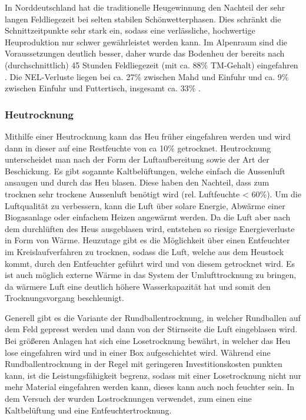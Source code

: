 In Norddeutschland hat die traditionelle Heugewinnung den Nachteil der sehr langen Feldliegezeit bei selten stabilen Schönwetterphasen.
Dies schränkt die Schnittzeitpunkte sehr stark ein, sodass eine verlässliche, hochwertige Heuproduktion nur schwer gewährleistet werden kann.
Im Alpenraum sind die Voraussetzungen deutlich besser, daher wurde das Bodenheu der \HBLFA bereits nach (durchschnittlich) 45 Stunden Feldliegezeit (mit ca. 88\% \ac{TM}-Gehalt) eingefahren \parencite[63]{gruber2015einfluss}.
Die \ac{NEL}-Verluste liegen bei ca. 27\% zwischen Mahd und Einfuhr und ca. 9\% zwischen Einfuhr und Futtertisch, insgesamt ca. 33\% \parencite[30]{fritz2018wirtschaftliche}.

\subsubsection{Heutrocknung}
\label{subsub:Heutrocknung}
Mithilfe einer Heutrocknung kann das Heu früher eingefahren werden und wird dann in dieser auf eine Restfeuchte von ca 10\% getrocknet.
Heutrocknung unterscheidet man nach der Form der Luftaufbereitung sowie der Art der Beschickung.
Es gibt sogannte Kaltbelüftungen, welche einfach die Aussenluft ansaugen und durch das Heu blasen.
Diese haben den Nachteil, dass zum trocknen sehr trockene Aussenluft benötigt wird (rel. Luftfeuchte < 60\%).
Um die Luftqualität zu verbessern, kann die Luft über solare Energie, Abwärme einer Biogasanlage oder einfachem Heizen angewärmt werden.
Da die Luft aber nach dem durchlüften des Heus ausgeblasen wird, entstehen so riesige Energieverluste in Form von Wärme.
Heuzutage gibt es die Möglichkeit über einen Entfeuchter im Kreislaufverfahren zu trocknen, sodass die Luft, welche aus dem Heustock kommt, durch den Entfeuchter geführt wird und von diesem getrocknet wird.
Es ist auch möglich externe Wärme in das System der Umlufttrocknung zu bringen, da wärmere Luft eine deutlich höhere Wasserkapazität hat und somit den Trocknungsvorgang beschleunigt.

Generell gibt es die Variante der Rundballentrocknung, in welcher Rundballen auf dem Feld gepresst werden und dann von der Stirnseite die Luft eingeblasen wird.
Bei größeren Anlagen hat sich eine Losetrocknung bewährt, in welcher das Heu lose eingefahren wird und in einer Box aufgeschichtet wird.
Während eine Rundballentrocknung in der Regel mit geringeren Investitionskosten punkten kann, ist die Leistungsfähigkeit begrenz, sodass mit einer Losetrocknung nicht nur mehr Material eingefahren werden kann, dieses kann auch noch feuchter sein.
In dem Versuch der \HBLFA wurden Lostrocknungen verwendet, zum einen eine Kaltbelüftung und eine Entfeuchtertrocknung.

